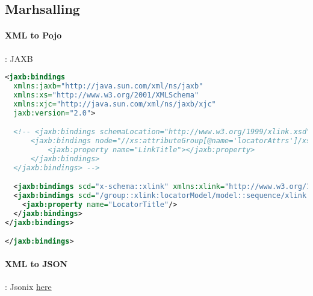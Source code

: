 \subsection{Marhsalling}

\paragraph{XML to Pojo}: JAXB
\begin{lstlisting}[language=xml]
  <jaxb:bindings
  xmlns:jaxb="http://java.sun.com/xml/ns/jaxb" 
  xmlns:xs="http://www.w3.org/2001/XMLSchema" 
  xmlns:xjc="http://java.sun.com/xml/ns/jaxb/xjc"  
  jaxb:version="2.0">

  <!-- <jaxb:bindings schemaLocation="http://www.w3.org/1999/xlink.xsd">
      <jaxb:bindings node="//xs:attributeGroup[@name='locatorAttrs']/xs:attribute[@ref=xlink:title]">
          <jaxb:property name="LinkTitle"></jaxb:property>
      </jaxb:bindings>
  </jaxb:bindings> -->

  <jaxb:bindings scd="x-schema::xlink" xmlns:xlink="http://www.w3.org/1999/xlink">
  <jaxb:bindings scd="/group::xlink:locatorModel/model::sequence/xlink:title">
    <jaxb:property name="LocatorTitle"/>
  </jaxb:bindings>
</jaxb:bindings>

</jaxb:bindings>
\end{lstlisting}

\paragraph{XML to JSON}: Jsonix
\href{https://github.com/highsource/jsonix-schema-compiler}{here}
